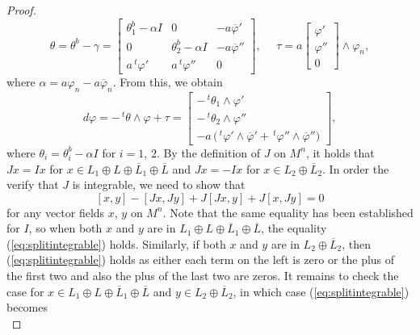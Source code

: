\documentclass{amsart}
\numberwithin{equation}{section}
\theoremstyle{definition}
\renewcommand{\1}{\mathds{1}}
\renewcommand{\>}{\rightarrow}
\begin{document}
\begin{proof}
\begin{equation} \label{eq:splittheta}
 \theta = \theta^b-\gamma = \left[ \begin{array}{ccc} \theta^b_1 -\alpha I & 0 &  -a\overline{\varphi}' \\  0 &\theta^b_2 -\alpha I & -a\overline{\varphi}''\\ a\,^t\!\varphi' & a\,^t\!\varphi'' &0 \end{array} \right], \ \ \ \ \ \ \tau = a \! \left[ \begin{array}{c} \varphi'   \\  \varphi'' \\ 0 \end{array} \right] \wedge \varphi_n,
 \end{equation}
where $\alpha = a\varphi_n - a\overline{\varphi}_n$. From this, we obtain
\begin{equation} \label{eq:splitstructure}
 d\varphi = -\,^t\!\theta \wedge \varphi + \tau = \left[ \begin{array}{c} -\,^t\!\theta_1 \wedge \varphi'   \\  -\,^t\!\theta_2\wedge \varphi'' \\ -a\,\big( \,^t\!\varphi' \wedge \overline{\varphi}' + \,^t\!\varphi'' \wedge \overline{\varphi}''  \big)  \end{array} \right],
\end{equation}
where $\theta_i = \theta^b_i-\alpha I$ for $i=1$, $2$. By the definition of $J$ on $M^n$, it holds that $Jx=Ix$ for $x\in L_1\oplus L\oplus \overline{L}_1\oplus \overline{L}$ and $Jx=-Ix$ for $x\in L_2\oplus \overline{L}_2$. In order the verify that $J$ is integrable, we need to show that
\begin{equation} \label{eq:splitintegrable}
 [x,y] -[Jx,Jy] + J [Jx,y] + J[x,Jy] =0
 \end{equation}
for any vector fields $x$, $y$ on $M^n$. Note that the same equality has been established for $I$, so when both $x$ and $y$ are in $L_1\oplus L\oplus \overline{L}_1\oplus \overline{L}$, the equality (\ref{eq:splitintegrable}) holds. Similarly, if both $x$ and $y$ are in $L_2\oplus \overline{L}_2$, then (\ref{eq:splitintegrable}) holds as either each term on the left is zero or the plus of the first two and also the plus of the last two are zeros. It remains to check the case for $x\in  L_1\oplus L\oplus \overline{L}_1\oplus \overline{L}$ and $y\in L_2\oplus \overline{L}_2$, in which case (\ref{eq:splitintegrable}) becomes
\begin{equation} \label{eq:splitintegrable2}

\end{equation}
\end{proof}
\end{document}
